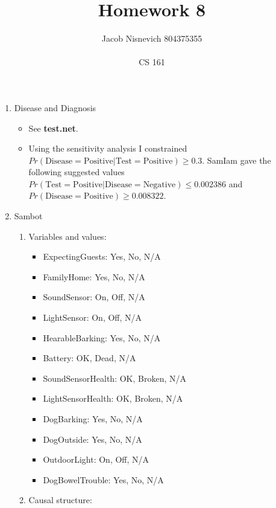 \documentclass[12pt]{article}
\begin{document}
 
\title{Homework 8}
\author{Jacob Nisnevich \textemdash \hspace{2px} 804375355 \\ \\
CS 161}
 
\maketitle
 
\begin{enumerate}
	\item Disease and Diagnosis

	\begin{itemize}
		\item See \textbf{test.net}.
		\item Using the sensitivity analysis I constrained $Pr(\text{Disease} = \text{Positive} | \text{Test} = \text{Positive}) \geq 0.3$. SamIam gave the following suggested values $Pr(\text{Test} = \text{Positive} | \text{Disease} = \text{Negative}) \leq 0.002386$ and $Pr(\text{Disease} = \text{Positive}) \geq 0.008322$.
	\end{itemize}

	\item Sambot

	\begin{enumerate}
		\item Variables and values:

		\begin{itemize}
			\item ExpectingGuests: Yes, No, N/A
			\item FamilyHome: Yes, No, N/A
			\item SoundSensor: On, Off, N/A
			\item LightSensor: On, Off, N/A
			\item HearableBarking: Yes, No, N/A
			\item Battery: OK, Dead, N/A
			\item SoundSensorHealth: OK, Broken, N/A
			\item LightSensorHealth: OK, Broken, N/A
			\item DogBarking: Yes, No, N/A
			\item DogOutside: Yes, No, N/A
			\item OutdoorLight: On, Off, N/A
			\item DogBowelTrouble: Yes, No, N/A
		\end{itemize}

		\item Causal structure:


\end{enumerate}
\end{enumerate}
\end{document}
